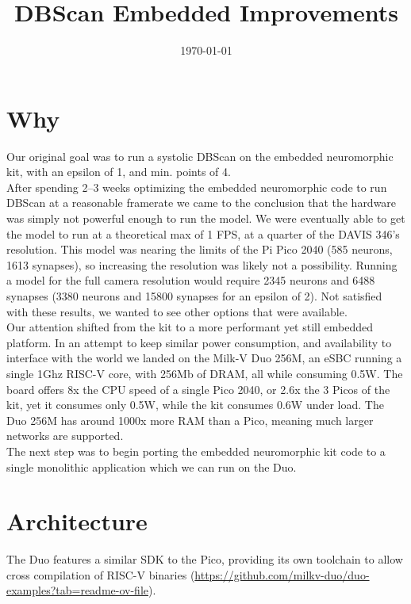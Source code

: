 \documentclass[conference]{IEEEtran}{article}
\date{\today}
\title{DBScan Embedded Improvements}
\begin{document}
\maketitle
\section{Why}
\label{sec:orgc658551}
Our original goal was to run a systolic DBScan on the embedded neuromorphic kit, with an epsilon of 1, and min. points of 4.\\

After spending 2–3 weeks optimizing the embedded neuromorphic code to run DBScan at a reasonable framerate we came to the conclusion that the hardware was simply not powerful enough to run the model. We were eventually able to get the model to run at a theoretical max of 1 FPS, at a quarter of the DAVIS 346's resolution. This model was nearing the limits of the Pi Pico 2040 (585 neurons, 1613 synapses), so increasing the resolution was likely not a possibility. Running a model for the full camera resolution would require 2345 neurons and 6488 synapses (3380 neurons and 15800 synapses for an epsilon of 2). Not satisfied with these results, we wanted to see other options that were available.\\

Our attention shifted from the kit to a more performant yet still embedded platform. In an attempt to keep similar power consumption, and availability to interface with the world we landed on the Milk-V Duo 256M, an eSBC running a single 1Ghz RISC-V core, with 256Mb of DRAM, all while consuming 0.5W. The board offers 8x the CPU speed of a single Pico 2040, or 2.6x the 3 Picos of the kit, yet it consumes only 0.5W, while the kit consumes 0.6W under load. The Duo 256M has around 1000x more RAM than a Pico, meaning much larger networks are supported.\\

The next step was to begin porting the embedded neuromorphic kit code to a single monolithic application which we can run on the Duo.\\
\section{Architecture}
\label{sec:org3cfd400}
The Duo features a similar SDK to the Pico, providing its own toolchain to allow cross compilation of RISC-V binaries (\url{https://github.com/milkv-duo/duo-examples?tab=readme-ov-file}).\\
\end{document}
